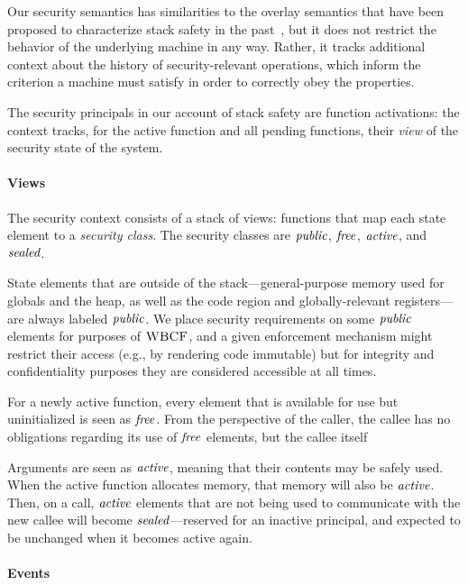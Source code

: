 \documentclass[10pt,conference]{ieeetran}%
\theoremstyle{definition}
\begin{document}
Our security semantics has similarities to the overlay semantics that have been proposed
to characterize stack safety in the past~\cite{SkorstengaardSTK}, but it does not restrict
the behavior of the underlying machine in any way. Rather, it tracks additional context
about the history of security-relevant operations, which inform the criterion a machine
must satisfy in order to correctly obey the properties.

The security principals in our account of stack safety are function
activations: the context tracks, for the active function and all pending
functions, their {\em view} of the security state of the system.

\paragraph*{Views}

The security context consists of a stack of views: functions that map
each state element to a {\it security class}. The security classes are
\(\mathit{public}\), \(\mathit{free}\), \(\mathit{active}\), and \(\mathit{sealed}\).

State elements that are outside of the stack---general-purpose memory used for
globals and the heap, as well as the code region and globally-relevant
registers---are always labeled \(\mathit{public}\). We place security requirements on some
\(\mathit{public}\) elements for purposes of \(\textnormal{\sc WBCF}\), and a given enforcement mechanism
might restrict their access (e.g., by rendering code immutable) but for integrity
and confidentiality purposes they are considered accessible at all times.

For a newly active function, every element that is available for use but uninitialized
is seen as \(\mathit{free}\). From the perspective of the caller, the callee has no obligations
regarding its use of \(\mathit{free}\) elements, but the callee itself 

Arguments are seen as \(\mathit{active}\), meaning that their contents may be safely used.
When the active function allocates memory, that memory will also be \(\mathit{active}\).
Then, on a call, \(\mathit{active}\) elements that are not being used to communicate with
the new callee will become \(\mathit{sealed}\)---reserved for an inactive principal,
and expected to be unchanged when it becomes active again.

\paragraph*{Events}
\end{document}
